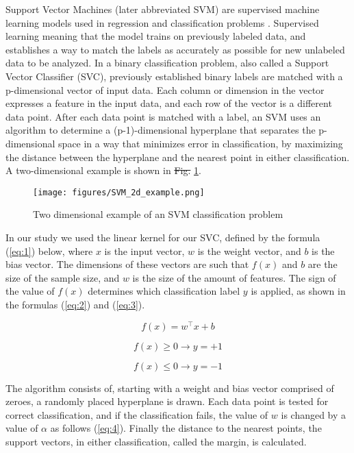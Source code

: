 \documentclass[review]{elsarticle}
\providecommand{\DIFaddtex}[1]{{\protect\color{blue}\uwave{#1}}} %
\providecommand{\DIFdeltex}[1]{{\protect\color{red}\sout{#1}}}                      %
\providecommand{\DIFaddbegin}{} %
\providecommand{\DIFaddend}{} %
\providecommand{\DIFdelbegin}{} %
\providecommand{\DIFdelend}{} %
\providecommand{\DIFadd}[1]{\texorpdfstring{\DIFaddtex{#1}}{#1}} %
\providecommand{\DIFdel}[1]{\texorpdfstring{\DIFdeltex{#1}}{}} %
\begin{document}
Support Vector Machines (later abbreviated SVM) are supervised machine learning models used in regression and classification problems \cite{35}. Supervised learning meaning that the model trains on previously labeled data, and establishes a way to match the labels as accurately as possible for new unlabeled data to be analyzed. In a binary classification problem, also called a Support Vector Classifier (SVC), previously established binary labels are matched with a p-dimensional vector of input data. Each column or dimension in the vector expresses a feature in the input data, and each row of the vector is a different data point. After each data point is matched with a label, an SVM uses an algorithm to determine a (p-1)-dimensional hyperplane that separates the p-dimensional space in a way that minimizes error in classification, by maximizing the distance between the hyperplane and the nearest point in either classification. A two-dimensional example is shown in \DIFdelbegin \DIFdel{Fig. }\DIFdelend \DIFaddbegin \DIFadd{Figure }\DIFaddend \ref{fig:svm}.

\begin{figure}
\centering
\texttt{[image: figures/SVM\_2d\_example.png]}
\caption{Two dimensional example of an SVM classification problem}
\label{fig:svm}
\end{figure}

In our study we used the linear kernel for our SVC, defined by the formula (\ref{eq:1}) below, where \(x\) is the input vector, \(w\) is the weight vector, and \(b\) is the bias vector. The dimensions of these vectors are such that \(f(x)\) and \(b\) are the size of the sample size, and \(w\) is the size of the amount of features. The sign of the value of \(f(x)\) determines which classification label \(y\) is applied, as shown in the formulas (\ref{eq:2}) and (\ref{eq:3}). 

\begin{equation}\label{eq:1}
f(x) = w^\top x + b
\end{equation}

\begin{equation}\label{eq:2}
f(x)\geq 0 \rightarrow y= +1 
\end{equation}

\begin{equation}\label{eq:3}
f(x)\leq 0 \rightarrow y= -1 
\end{equation}

The algorithm consists of, starting with a weight and bias vector comprised of zeroes, a randomly placed hyperplane is drawn. Each data point is tested for correct classification, and if the classification fails, the value of \(w\) is changed by a value of \(\alpha\) as follows (\ref{eq:4}). Finally the distance to the nearest points, the support vectors, in either classification, called the margin, is calculated.
\end{document}
